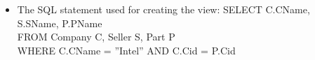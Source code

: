 {\begin{itemize}
\begin{itemize}
\begin{itemize}
		Company, Seller and Part tables.
		\item{The table headers (all attributes): }\\
		Company: Cid, CName\\
		Part: Pid, PName, Description, Price, Cid\\
		Seller: Sid, SName
		\item{The table attributes that take part in the view: }
		Company: CName\\
		Part: PName\\
		Seller: SName
	\end{itemize}
	\item{The SQL statement used for creating the view: }
	SELECT C.CName, S.SName, P.PName\\
	FROM Company C, Seller S, Part P\\
	WHERE C.CName = ''Intel'' AND C.Cid = P.Cid
\end{itemize}
\end{itemize}
}
